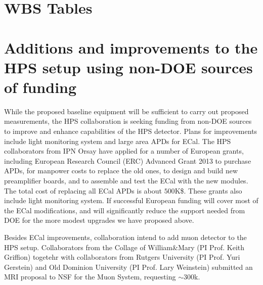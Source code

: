 \appendix
\renewcommand*{\thesubsection}{\thesection.\arabic{subsection}}
\renewcommand*{\thesubsubsection}{\thesubsection.\arabic{subsubsection}}

\section{WBS Tables}
\label{sec:wbs}

\clearpage



\section{Additions and improvements to the HPS setup using non-DOE sources of funding}

While the proposed baseline equipment will be sufficient to carry out proposed measurements, the HPS collaboration is seeking funding from non-DOE sources to improve and enhance capabilities of the HPS detector. Plans for improvements include light monitoring system and large area APDs for ECal.  The HPS collaborators from IPN Orsay have applied for a number of European grants, including European Research Council (ERC) Advanced Grant 2013 to purchase APDs, for manpower costs to replace the old ones, to design and build 
new preamplifier boards, and to assemble and test the ECal with the new modules. The total cost of replacing all ECal APDs is about $500$K\$. 
These grants also include light monitoring system. If successful European funding will cover most of the ECal modifications, and will significantly reduce the support needed from DOE for the more modest upgrades we have proposed above. 

Besides ECal improvements, collaboration intend to add muon detector to the HPS setup. Collaborators from the Collage of William\&Mary (PI Prof. Keith Griffion) togetehr with collaborators from Rutgers University (PI Prof. Yuri Gerstein) and Old Dominion University (PI Prof. Lary Weinstein) submitted an MRI proposal to NSF for the Muon System, requesting $\sim 300$k.  

